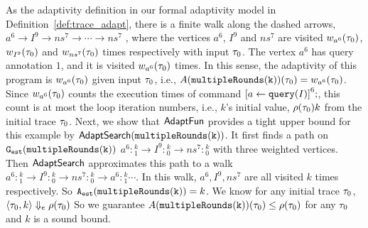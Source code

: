 \begin{example}
As the adaptivity definition in our formal adaptivity model in Definition~\ref{def:trace_adapt},
there is a finite walk along the dashed arrows,
$a^{6} \to I^9 \to ns^{7} \to  \cdots \to ns^7$ , 
where the vertices $a^{6}$, $I^9$ and $ns^{7}$ are visited $w_{a^{6}}(\mathtt{\tau}_0)$,
$w_{I^9}(\mathtt{\tau}_0)$ and $w_{ns^{7}}(\mathtt{\tau}_0)$
times respectively with input $\mathtt{\tau}_0$.
The vertex $a^{6}$ has query annotation $1$, and it is visited $w_{a^{6}}(\mathtt{\tau}_0)$ times.
In this sense, the adaptivity of this program is
$w_{a^{6}}(\mathtt{\tau}_0)$ given input $\mathtt{\tau}_0$, i.e., $A(\mathtt{multipleRounds(k)})(\mathtt{\tau}_0) = w_{a^{6}}(\mathtt{\tau}_0)$.
Since $w_{a^{6}}(\mathtt{\tau}_0)$
counts the execution times of command $\clabel{\assign{a}{\query(I)}}^6;$,
this count is at most the loop iteration numbers, i.e., $k$'s initial value, $\rho(\mathtt{\tau}_0) k$ from the initial trace $\mathtt{\tau}_0$.
{
Next, we show that {$\textsf{AdaptFun}$} provides a tight upper bound for this example by $\mathsf{AdaptSearch}(\mathtt{multipleRounds(k)})$.
It first finds a path on $\mathtt{{G_{est}}}(\mathtt{multipleRounds(k)})$
$a^{6}: {}^k_1 \to I^9:{}^k_0 \to ns^7:{}^k_0$ with three weighted vertices. 
Then $\mathsf{AdaptSearch}$ approximates this path to a walk $a^{6}: {}^k_1 \to I^9:{}^k_0 \to ns^7:{}^k_0 \to a^{6}: {}^k_1 \cdots$.
In this walk, $a^6, I^9, ns^{7}$ are all visited $k$ times respectively. 
So ${\mathtt{A_{est}}}(\mathtt{multipleRounds(k)}) = k$.
We know for any initial trace $\mathtt{\tau}_0$, $\langle \mathtt{\tau}_0, k \rangle \Downarrow_e \rho(\mathtt{\tau}_0)$
So we guarantee $A(\mathtt{multipleRounds(k)})(\mathtt{\tau}_0) \leq \rho(\mathtt{\tau}_0)$ for any $\mathtt{\tau}_0$
and $k$ is a sound bound.
}
\end{example}
%
